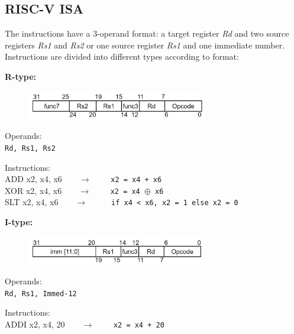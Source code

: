 \subsection{RISC-V ISA}
\label{subsection:ISA}
The instructions have a 3-operand format: a target register \textit{Rd} and two source registers \textit{Rs1} and \textit{Rs2} or one source register \textit{Rs1} and one immediate number. Instructions are divided into different types according to format:\\

\begin{description}
	\item \textbf{R-type:}
  \begin{figure}[h]
    \center
    \includegraphics[width=0.7\textwidth]{sec1/images/Rtype.png}
  \end{figure}
	\begin{description}
		\item Operands:\\
		\texttt{Rd, Rs1, Rs2}
		\item Instructions:\\
		\textsf{ADD x2, x4, x6}\ \ \ \ $\longrightarrow$ \ \ \ \ \texttt{x2 = x4 + x6} \\
    \textsf{XOR x2, x4, x6}\ \ \ \ $\longrightarrow$ \ \ \ \ \texttt{x2 = x4 $\oplus$ x6} \\
    \textsf{SLT x2, x4, x6}\ \ \ \ $\longrightarrow$ \ \ \ \ \texttt{ if x4 < x6, x2 = 1 else x2 = 0}
	\end{description}
	\item \textbf{I-type:}
  \begin{figure}[h]
    \center
    \includegraphics[width=0.7\textwidth]{sec1/images/Itype.png}
  \end{figure}
	\begin{description}
		\item Operands:\\
		\texttt{Rd, Rs1, Immed-12}
		\item Instructions:\\
		\textsf{ADDI x2, x4, 20}\ \ \ \ $\longrightarrow$ \ \ \ \ \texttt{x2 = x4 + 20} \\

\end{description}
\end{description}

